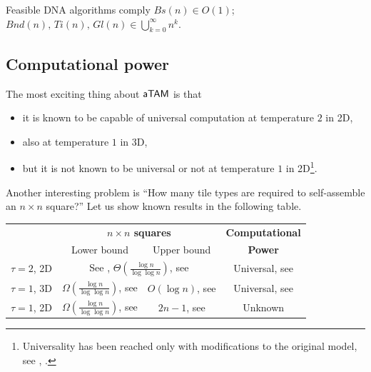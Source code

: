 	\begin{thesis}
	\label{ths:feasible}
		Feasible DNA algorithms comply $Bs(n)\in O(1)$; $Bnd(n),\,Ti(n),\,Gl(n)\in \bigcup\limits_{k=0}^{\infty}n^k$.
	\end{thesis}


\subsection{Computational power}
\label{sec:wang_power}
	
	The most exciting thing about $\mathsf{aTAM}$ is that
	\begin{itemize}
		\item it is known to be capable of universal computation at temperature $2$ in 2D,
		\item also at temperature $1$ in 3D,
		\item but it is not known to be universal or not at temperature $1$ in 2D\footnote{Universality has been reached only with modifications to the original model, see \cite{stage_assembly}, \cite{active_tiles}.}.
	\end{itemize}
	Another interesting problem is ``How many tile types are required to self-assemble an $n\times n$ square?'' Let us show known results in the following table.
	
	\begin{center}
	\begin{tabular}{|| c || c | c | c ||}
		\hline\hline
		~ & \multicolumn{2}{c|}{\bf $n\times n$ squares} & {\bf Computational} \\
		~ & \multicolumn{1}{c}{Lower bound} & \multicolumn{1}{c|}{Upper bound} & {\bf Power}\\
		\hline
		$\tau=2$, 2D & \multicolumn{2}{c|}{See \cite{square_lb}, $\Theta(\frac{\log n}{\log\log n})$, see \cite{square_ub}} & Universal, see \cite{winfree_phd} \\
		\hline
		$\tau=1$, 3D & $\Omega(\frac{\log n}{\log\log n})$, see \cite{square_lb} & $O(\log n)$, see \cite{cook_temp1} & Universal, see \cite{cook_temp1} \\
		\hline
		$\tau=1$, 2D & $\Omega(\frac{\log n}{\log\log n})$, see \cite{square_lb} & $2n-1$, see \cite{square_lb} & Unknown \\
		\hline\hline
	\end{tabular}
	\end{center}


